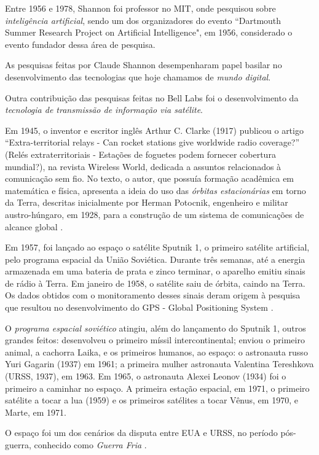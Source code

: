 \documentclass{hipatia}
\begin{document}
Entre 1956 e 1978, Shannon foi professor no MIT, onde pesquisou sobre \textit{inteligência artificial}, sendo um dos organizadores do evento ``Dartmouth Summer Research Project on Artificial Intelligence", em 1956, considerado o evento fundador dessa área de pesquisa.

As pesquisas feitas por Claude Shannon desempenharam papel basilar no desenvolvimento das tecnologias que hoje chamamos de \textit{mundo digital}.

Outra contribuição das pesquisas feitas no Bell Labs foi o desenvolvimento da \textit{tecnologia de transmissão de informação via satélite}.

Em 1945, o inventor e escritor inglês Arthur C. Clarke (1917) publicou o artigo ``Extra-territorial relays - Can rocket stations give worldwide radio coverage?'' (Relés extraterritoriais - Estações de foguetes podem fornecer cobertura mundial?), na revista Wireless World, dedicada a assuntos relacionados à comunicação sem fio. No texto, o autor, que possuía formação acadêmica em matemática e física, apresenta a ideia do uso das \textit{órbitas estacionárias} em torno da Terra, descritas inicialmente por Herman Potocnik, engenheiro e militar austro-húngaro, em 1928, para a construção de um sistema de comunicações de alcance global \cite{ClarkeFoundation2026}.

Em 1957, foi lançado ao espaço o satélite Sputnik 1, o primeiro satélite artificial, pelo programa espacial da União Soviética. Durante três semanas, até a energia armazenada  em uma bateria de prata e zinco terminar, o aparelho emitiu sinais de rádio à Terra. Em janeiro de 1958, o satélite saiu de órbita, caindo na Terra. Os dados obtidos com o monitoramento desses sinais deram origem à pesquisa que resultou no desenvolvimento do GPS - Global Positioning System \cite{Riordan1997}.

O \textit{programa espacial soviético} atingiu, além do lançamento do Sputnik 1, outros grandes feitos: desenvolveu o primeiro míssil intercontinental; enviou o primeiro animal, a cachorra Laika, e os primeiros humanos, ao espaço: o astronauta russo Yuri Gagarin (1937) em 1961; a primeira mulher astronauta Valentina Tereshkova (URSS, 1937), em 1963. Em 1965, o astronauta Alexei Leonov (1934) foi o primeiro a caminhar no espaço. A primeira estação espacial, em 1971, o primeiro satélite a tocar a lua (1959) e os primeiros satélites a tocar Vênus, em 1970, e Marte, em 1971.

O espaço foi um dos cenários da disputa entre EUA e URSS, no período pós-guerra, conhecido como \textit{Guerra Fria} 	\cite{Hobsbawm1995}.
\end{document}
